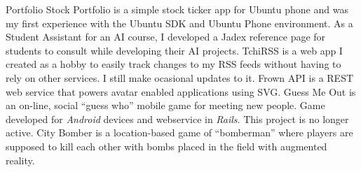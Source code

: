 
\begin{rubric}{Portfolio}
		Stock Portfolio is a simple stock ticker app for Ubuntu phone and was
		my first experience with the Ubuntu	SDK and Ubuntu Phone environment.
	\in{}
		As a Student Assistant for an AI course, I developed a Jadex reference page
		for students to consult while developing their AI projects.
	\in{}
		TchiRSS is a web app I created as a hobby to easily track changes to my
		RSS feeds without having to rely on other services. I still make
		ocasional updates to it. 
	\in{}
		Frown API is a REST web service that powers avatar enabled applications using SVG.
		Guess Me Out is an on-line, social ``guess who'' mobile game for meeting new people.
		Game developed for \emph{Android} devices and webservice in \emph{Rails}. This
		project is no longer active. 
	\in{}
		City Bomber is a location-based game of ``bomberman'' where players are supposed
		to kill each other with bombs placed in the field with augmented reality.
\end{rubric}
